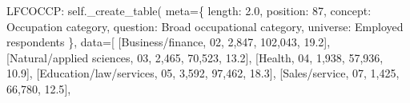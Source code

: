 \documentclass[
  11pt,
  a4paper,
]{article}
\newenvironment{Shaded}{\begin{snugshade}}{\end{snugshade}}
\newcommand{\NormalTok}[1]{\textcolor[rgb]{0.00,0.23,0.31}{#1}}
\newcommand{\OperatorTok}[1]{\textcolor[rgb]{0.37,0.37,0.37}{#1}}
\newcommand{\StringTok}[1]{\textcolor[rgb]{0.13,0.47,0.30}{#1}}
\newcommand{\VariableTok}[1]{\textcolor[rgb]{0.07,0.07,0.07}{#1}}
\begin{document}
\begin{Shaded}
\begin{Highlighting}[]
            \StringTok{\textquotesingle{}LFCOCCP\textquotesingle{}}\NormalTok{: }\VariableTok{self}\NormalTok{.\_create\_table(}
\NormalTok{                meta}\OperatorTok{=}\NormalTok{\{}
                    \StringTok{\textquotesingle{}length\textquotesingle{}}\NormalTok{: }\StringTok{\textquotesingle{}2.0\textquotesingle{}}\NormalTok{, }\StringTok{\textquotesingle{}position\textquotesingle{}}\NormalTok{: }\StringTok{\textquotesingle{}87\textquotesingle{}}\NormalTok{,}
                    \StringTok{\textquotesingle{}concept\textquotesingle{}}\NormalTok{: }\StringTok{\textquotesingle{}Occupation category\textquotesingle{}}\NormalTok{,}
                    \StringTok{\textquotesingle{}question\textquotesingle{}}\NormalTok{: }\StringTok{\textquotesingle{}Broad occupational category\textquotesingle{}}\NormalTok{,}
                    \StringTok{\textquotesingle{}universe\textquotesingle{}}\NormalTok{: }\StringTok{\textquotesingle{}Employed respondents\textquotesingle{}}
\NormalTok{                \},}
\NormalTok{                data}\OperatorTok{=}\NormalTok{[}
\NormalTok{                    [}\StringTok{\textquotesingle{}Business/finance\textquotesingle{}}\NormalTok{, }\StringTok{\textquotesingle{}02\textquotesingle{}}\NormalTok{, }\StringTok{\textquotesingle{}2,847\textquotesingle{}}\NormalTok{, }\StringTok{\textquotesingle{}102,043\textquotesingle{}}\NormalTok{, }\StringTok{\textquotesingle{}19.2\textquotesingle{}}\NormalTok{],}
\NormalTok{                    [}\StringTok{\textquotesingle{}Natural/applied sciences\textquotesingle{}}\NormalTok{, }\StringTok{\textquotesingle{}03\textquotesingle{}}\NormalTok{, }\StringTok{\textquotesingle{}2,465\textquotesingle{}}\NormalTok{, }\StringTok{\textquotesingle{}70,523\textquotesingle{}}\NormalTok{, }\StringTok{\textquotesingle{}13.2\textquotesingle{}}\NormalTok{],}
\NormalTok{                    [}\StringTok{\textquotesingle{}Health\textquotesingle{}}\NormalTok{, }\StringTok{\textquotesingle{}04\textquotesingle{}}\NormalTok{, }\StringTok{\textquotesingle{}1,938\textquotesingle{}}\NormalTok{, }\StringTok{\textquotesingle{}57,936\textquotesingle{}}\NormalTok{, }\StringTok{\textquotesingle{}10.9\textquotesingle{}}\NormalTok{],}
\NormalTok{                    [}\StringTok{\textquotesingle{}Education/law/services\textquotesingle{}}\NormalTok{, }\StringTok{\textquotesingle{}05\textquotesingle{}}\NormalTok{, }\StringTok{\textquotesingle{}3,592\textquotesingle{}}\NormalTok{, }\StringTok{\textquotesingle{}97,462\textquotesingle{}}\NormalTok{, }\StringTok{\textquotesingle{}18.3\textquotesingle{}}\NormalTok{],}
\NormalTok{                    [}\StringTok{\textquotesingle{}Sales/service\textquotesingle{}}\NormalTok{, }\StringTok{\textquotesingle{}07\textquotesingle{}}\NormalTok{, }\StringTok{\textquotesingle{}1,425\textquotesingle{}}\NormalTok{, }\StringTok{\textquotesingle{}66,780\textquotesingle{}}\NormalTok{, }\StringTok{\textquotesingle{}12.5\textquotesingle{}}\NormalTok{],}

\end{Highlighting}
\end{Shaded}
\end{document}
